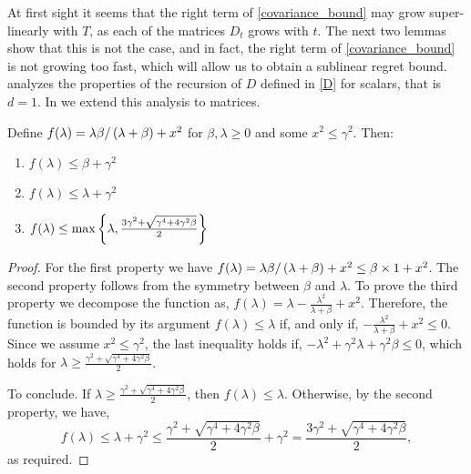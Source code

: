 At first sight it seems that the right term of
\eqref{covariance_bound} may grow super-linearly with $T$, as each of the
matrices $D_{t}$ grows with $t$. The next two lemmas show that this
is not the case, and in fact, the right term of
\eqref{covariance_bound} is not growing too fast, which will allow us to
obtain a sublinear regret bound.  analyzes
the properties of the recursion of $D$ defined in
\eqref{D} for scalars, that is $d=1$. In  we extend
this analysis to matrices.
\begin{lemma}
\label{operator_scalar}
Define
\(
f(\lambda) = {\lambda \beta}/\left({\lambda+ \beta}\right) + x^2
\)
for $\beta,\lambda \geq 0$ and some $x^2 \leq \gamma^2$. Then:
\begin{enumerate}
\item $f(\lambda) \leq \beta +
\gamma^2$
\item $f(\lambda) \leq \lambda + \gamma^2$
\item $f(\lambda) \leq \max\left\{{\lambda,\frac{3\gamma^2 +
  \sqrt{\gamma^4+4\gamma^2\beta}}{2}}\right\}$
\end{enumerate}
\end{lemma}
\begin{proof}
For the first property we have $f(\lambda) = {\lambda
  \beta}/\left({\lambda+ \beta}\right) + x^2 \leq \beta\times 1 + x^2$.
The second property follows from the symmetry between $\beta$ and
$\lambda$.
%
To prove the third property we decompose the function as,
\(
f(\lambda) = \lambda - \frac{\lambda^2 }{\lambda+ \beta} + x^2
\).
Therefore, the function is bounded by its argument $f(\lambda)\leq
\lambda$ if, and only if, $- \frac{\lambda^2 }{\lambda+ \beta} + x^2
\leq 0$.
Since we assume $x^2\leq\gamma^2$, the last inequality holds if,
\(
-\lambda^2 + \gamma^2 \lambda + \gamma^2\beta \leq 0
\),
which holds for $\lambda \geq \frac{\gamma^2 +
  \sqrt{\gamma^4+4\gamma^2\beta}}{2}$.

To conclude. If $\lambda \geq \frac{\gamma^2 +
  \sqrt{\gamma^4+4\gamma^2\beta}}{2}$, then $f(\lambda) \! \leq \! \lambda$.
Otherwise, by the second property, we have, $$f(\lambda) \! \leq \! \lambda\!+\!\gamma^2
\! \leq \! \frac{\gamma^2 \!+\!
  \sqrt{\gamma^4\!+\!4\gamma^2\beta}}{2} \!+\! \gamma^2 = \frac{3\gamma^2 \!+\!
  \sqrt{\gamma^4\!+\!4\gamma^2\beta}}{2},$$as required.%
\QED
\end{proof}


